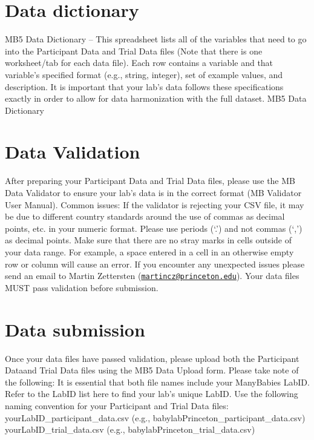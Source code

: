 \documentclass[
]{book}
\begin{document}
\hypertarget{data-dictionary}{%
\section{Data dictionary}\label{data-dictionary}}

MB5 Data Dictionary -- This spreadsheet lists all of the variables that need to go into the Participant Data and Trial Data files (Note that there is one worksheet/tab for each data file). Each row contains a variable and that variable's specified format (e.g., string, integer), set of example values, and description. It is important that your lab's data follows these specifications exactly in order to allow for data harmonization with the full dataset.
MB5 Data Dictionary

\hypertarget{data-validation}{%
\section{Data Validation}\label{data-validation}}

After preparing your Participant Data and Trial Data files, please use the MB Data Validator to ensure your lab's data is in the correct format (MB Validator User Manual).
Common issues:
If the validator is rejecting your CSV file, it may be due to different country standards around the use of commas as decimal points, etc. in your numeric format. Please use periods (`.') and not commas (`,') as decimal points.
Make sure that there are no stray marks in cells outside of your data range. For example, a space entered in a cell in an otherwise empty row or column will cause an error.
If you encounter any unexpected issues please send an email to Martin Zettersten (\href{mailto:martincz@princeton.edu}{\nolinkurl{martincz@princeton.edu}}). Your data files MUST pass validation before submission.

\hypertarget{data-submission}{%
\section{Data submission}\label{data-submission}}

Once your data files have passed validation, please upload both the Participant Dataand Trial Data files using the MB5 Data Upload form. Please take note of the following:
It is essential that both file names include your ManyBabies LabID. Refer to the LabID list here to find your lab's unique LabID.
Use the following naming convention for your Participant and Trial Data files:
yourLabID\_participant\_data.csv (e.g., babylabPrinceton\_participant\_data.csv)
yourLabID\_trial\_data.csv (e.g., babylabPrinceton\_trial\_data.csv)
\end{document}
